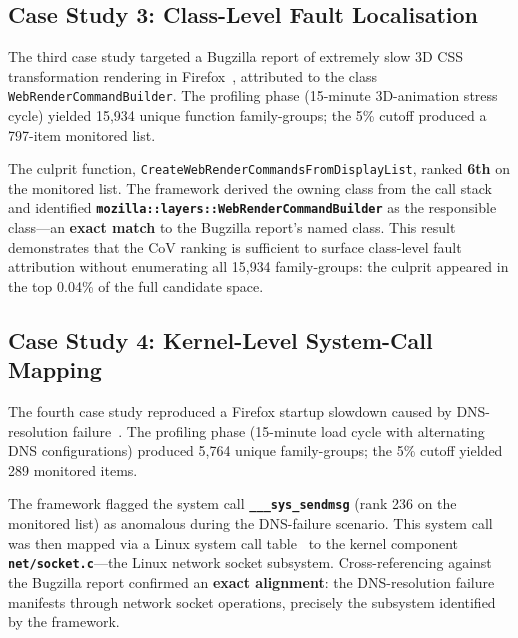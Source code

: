 \documentclass[pdflatex,sn-nature]{sn-jnl}
\theoremstyle{thmstyleone}%
\begin{document}
\subsection{Case Study 3: Class-Level Fault Localisation}\label{sec:cs3}

The third case study targeted a Bugzilla report of extremely slow 3D CSS
transformation rendering in Firefox~\cite{muizelaar-2020}, attributed to the
class \texttt{WebRenderCommandBuilder}.
The profiling phase (15-minute 3D-animation stress cycle) yielded 15,934 unique
function family-groups; the 5\% cutoff produced a 797-item monitored list.

The culprit function, \texttt{CreateWebRenderCommandsFromDisplayList},
ranked \textbf{6th} on the monitored list.
The framework derived the owning class from the call stack and identified
\textbf{\texttt{mozilla::layers::WebRenderCommandBuilder}} as the responsible
class---an \textbf{exact match} to the Bugzilla report's named class.
This result demonstrates that the CoV ranking is sufficient to surface
class-level fault attribution without enumerating all 15,934 family-groups:
the culprit appeared in the top 0.04\% of the full candidate space.

\subsection{Case Study 4: Kernel-Level System-Call Mapping}\label{sec:cs4}

The fourth case study reproduced a Firefox startup slowdown caused by
DNS-resolution failure~\cite{cook-2022}.
The profiling phase (15-minute load cycle with alternating DNS configurations)
produced 5,764 unique family-groups; the 5\% cutoff yielded 289 monitored items.

The framework flagged the system call \textbf{\texttt{\_\_\_sys\_sendmsg}}
(rank 236 on the monitored list) as anomalous during the DNS-failure scenario.
This system call was then mapped via a Linux system call
table~\cite{valsorda-no-date} to the kernel component
\textbf{\texttt{net/socket.c}}---the Linux network socket subsystem.
Cross-referencing against the Bugzilla report confirmed an \textbf{exact
alignment}: the DNS-resolution failure manifests through network socket
operations, precisely the subsystem identified by the framework.
\end{document}
